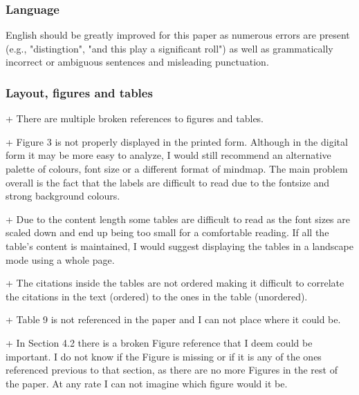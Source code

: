 \subsubsection{Language}

English should be greatly improved for this paper as numerous errors
are present (e.g., "distingtion", "and this play a significant roll")
as well as grammatically incorrect or ambiguous sentences and
misleading punctuation.



\subsubsection{Layout, figures and tables}

+ There are multiple broken references to figures and tables.


+ Figure 3 is not properly displayed in the printed form. Although in
the digital form it may be more easy to analyze, I would still
recommend an alternative palette of colours, font size or a different
format of mindmap. The main problem overall is the fact that the
labels are difficult to read due to the fontsize and strong background
colours.






+ Due to the content length some tables are difficult to read as the
font sizes are scaled down and end up being too small for a
comfortable reading. If all the table's content is maintained, I would
suggest displaying the tables in a landscape mode using a whole page.


+ The citations inside the tables are not ordered making it difficult
to correlate the citations in the text (ordered) to the ones in the
table (unordered).


+ Table 9 is not referenced in the paper and I can not place where it
could be.


+ In Section 4.2 there is a broken Figure reference that I deem could
be important. I do not know if the Figure is missing or if it is any
of the ones referenced previous to that section, as there are no more
Figures in the rest of the paper. At any rate I can not imagine which
figure would it be.

